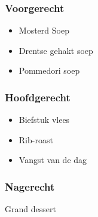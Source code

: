 \subsubsection*{Voorgerecht}
\begin{itemize}
	\item Mosterd Soep
	\item Drentse gehakt soep
	\item Pommedori soep
\end{itemize}

\subsubsection*{Hoofdgerecht}
\begin{itemize}
	\item Biefstuk vlees
	\item Rib-roast
	\item Vangst van de dag
\end{itemize}

\subsubsection*{Nagerecht}
Grand dessert
